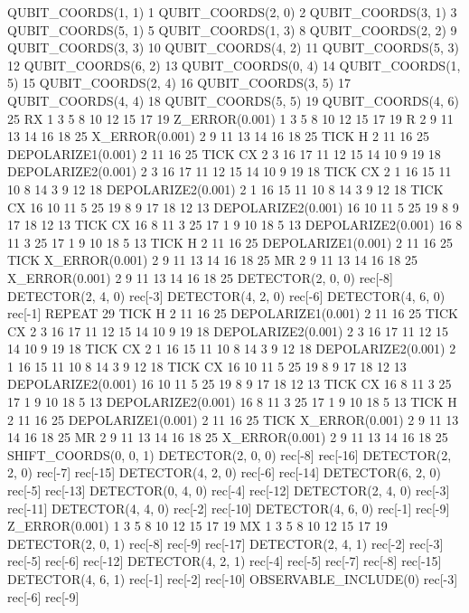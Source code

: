 QUBIT_COORDS(1, 1) 1
QUBIT_COORDS(2, 0) 2
QUBIT_COORDS(3, 1) 3
QUBIT_COORDS(5, 1) 5
QUBIT_COORDS(1, 3) 8
QUBIT_COORDS(2, 2) 9
QUBIT_COORDS(3, 3) 10
QUBIT_COORDS(4, 2) 11
QUBIT_COORDS(5, 3) 12
QUBIT_COORDS(6, 2) 13
QUBIT_COORDS(0, 4) 14
QUBIT_COORDS(1, 5) 15
QUBIT_COORDS(2, 4) 16
QUBIT_COORDS(3, 5) 17
QUBIT_COORDS(4, 4) 18
QUBIT_COORDS(5, 5) 19
QUBIT_COORDS(4, 6) 25
RX 1 3 5 8 10 12 15 17 19
Z_ERROR(0.001) 1 3 5 8 10 12 15 17 19
R 2 9 11 13 14 16 18 25
X_ERROR(0.001) 2 9 11 13 14 16 18 25
TICK
H 2 11 16 25
DEPOLARIZE1(0.001) 2 11 16 25
TICK
CX 2 3 16 17 11 12 15 14 10 9 19 18
DEPOLARIZE2(0.001) 2 3 16 17 11 12 15 14 10 9 19 18
TICK
CX 2 1 16 15 11 10 8 14 3 9 12 18
DEPOLARIZE2(0.001) 2 1 16 15 11 10 8 14 3 9 12 18
TICK
CX 16 10 11 5 25 19 8 9 17 18 12 13
DEPOLARIZE2(0.001) 16 10 11 5 25 19 8 9 17 18 12 13
TICK
CX 16 8 11 3 25 17 1 9 10 18 5 13
DEPOLARIZE2(0.001) 16 8 11 3 25 17 1 9 10 18 5 13
TICK
H 2 11 16 25
DEPOLARIZE1(0.001) 2 11 16 25
TICK
X_ERROR(0.001) 2 9 11 13 14 16 18 25
MR 2 9 11 13 14 16 18 25
X_ERROR(0.001) 2 9 11 13 14 16 18 25
DETECTOR(2, 0, 0) rec[-8]
DETECTOR(2, 4, 0) rec[-3]
DETECTOR(4, 2, 0) rec[-6]
DETECTOR(4, 6, 0) rec[-1]
REPEAT 29 {
    TICK
    H 2 11 16 25
    DEPOLARIZE1(0.001) 2 11 16 25
    TICK
    CX 2 3 16 17 11 12 15 14 10 9 19 18
    DEPOLARIZE2(0.001) 2 3 16 17 11 12 15 14 10 9 19 18
    TICK
    CX 2 1 16 15 11 10 8 14 3 9 12 18
    DEPOLARIZE2(0.001) 2 1 16 15 11 10 8 14 3 9 12 18
    TICK
    CX 16 10 11 5 25 19 8 9 17 18 12 13
    DEPOLARIZE2(0.001) 16 10 11 5 25 19 8 9 17 18 12 13
    TICK
    CX 16 8 11 3 25 17 1 9 10 18 5 13
    DEPOLARIZE2(0.001) 16 8 11 3 25 17 1 9 10 18 5 13
    TICK
    H 2 11 16 25
    DEPOLARIZE1(0.001) 2 11 16 25
    TICK
    X_ERROR(0.001) 2 9 11 13 14 16 18 25
    MR 2 9 11 13 14 16 18 25
    X_ERROR(0.001) 2 9 11 13 14 16 18 25
    SHIFT_COORDS(0, 0, 1)
    DETECTOR(2, 0, 0) rec[-8] rec[-16]
    DETECTOR(2, 2, 0) rec[-7] rec[-15]
    DETECTOR(4, 2, 0) rec[-6] rec[-14]
    DETECTOR(6, 2, 0) rec[-5] rec[-13]
    DETECTOR(0, 4, 0) rec[-4] rec[-12]
    DETECTOR(2, 4, 0) rec[-3] rec[-11]
    DETECTOR(4, 4, 0) rec[-2] rec[-10]
    DETECTOR(4, 6, 0) rec[-1] rec[-9]
}
Z_ERROR(0.001) 1 3 5 8 10 12 15 17 19
MX 1 3 5 8 10 12 15 17 19
DETECTOR(2, 0, 1) rec[-8] rec[-9] rec[-17]
DETECTOR(2, 4, 1) rec[-2] rec[-3] rec[-5] rec[-6] rec[-12]
DETECTOR(4, 2, 1) rec[-4] rec[-5] rec[-7] rec[-8] rec[-15]
DETECTOR(4, 6, 1) rec[-1] rec[-2] rec[-10]
OBSERVABLE_INCLUDE(0) rec[-3] rec[-6] rec[-9]